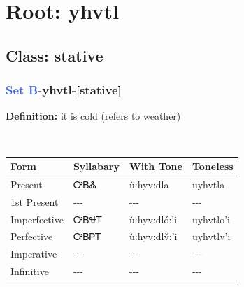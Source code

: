 \needspace{4in}
\section*{Root: yhvtl}
\nopagebreak
{}
\needspace{3in}
\subsection*{Class: stative}
\nopagebreak
\needspace{2in}
\subsubsection*{\textcolor{RoyalBlue}{Set B}{-}\textbf{yhvtl}{-}[stative]}
\nopagebreak
\textbf{Definition: } it is cold (refers to weather)
\\[0.5em]
\begin{tabularx}{\textwidth}{l X X X}%
\toprule%
\textbf{Form}&\textbf{Syllabary}&\textbf{With Tone}&\textbf{Toneless}\\%
\midrule%
Present&ᎤᏴᏜ&ù:hyv:dla&uyhvtla\\%
1st Present&{-}{-}{-}&{-}{-}{-}&{-}{-}{-}\\%
Imperfective&ᎤᏴᏠᎢ&ù:hyv:dló:’i&uyhvtlo'i\\%
Perfective&ᎤᏴᏢᎢ&ù:hyv:dlv̌:’i&uyhvtlv'i\\%
Imperative&{-}{-}{-}&{-}{-}{-}&{-}{-}{-}\\%
Infinitive&{-}{-}{-}&{-}{-}{-}&{-}{-}{-}\\%
\bottomrule%
\end{tabularx}
\\[1em]
